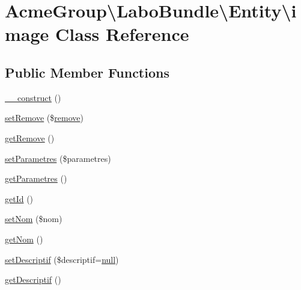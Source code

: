 \hypertarget{class_acme_group_1_1_labo_bundle_1_1_entity_1_1image}{\section{Acme\+Group\textbackslash{}Labo\+Bundle\textbackslash{}Entity\textbackslash{}image Class Reference}
\label{class_acme_group_1_1_labo_bundle_1_1_entity_1_1image}
}
\subsection*{Public Member Functions}
\begin{DoxyCompactItemize}
\item 
\hyperlink{class_acme_group_1_1_labo_bundle_1_1_entity_1_1image_aa2d1ca441aac516fc62f12dcbda72dad}{\+\_\+\+\_\+construct} ()
\item 
\hyperlink{class_acme_group_1_1_labo_bundle_1_1_entity_1_1image_a47f3c9cb7263e23f69d2a41422c66895}{set\+Remove} (\$\hyperlink{fullpage_2plugin_8min_8js_a3fe72a3812c61d06ea7c5cf2052f3dd2}{remove})
\item 
\hyperlink{class_acme_group_1_1_labo_bundle_1_1_entity_1_1image_a4228d93a78b52f097a9457e11b019880}{get\+Remove} ()
\item 
\hyperlink{class_acme_group_1_1_labo_bundle_1_1_entity_1_1image_af15509557d3d717c971e3a3719290ce8}{set\+Parametres} (\$parametres)
\item 
\hyperlink{class_acme_group_1_1_labo_bundle_1_1_entity_1_1image_a6f317bbb5610eede4e51395d07e6b376}{get\+Parametres} ()
\item 
\hyperlink{class_acme_group_1_1_labo_bundle_1_1_entity_1_1image_a27639d79aa66ce7b0d634f7e98c26cea}{get\+Id} ()
\item 
\hyperlink{class_acme_group_1_1_labo_bundle_1_1_entity_1_1image_ab0615daf61007af21762cabfb6e015b2}{set\+Nom} (\$nom)
\item 
\hyperlink{class_acme_group_1_1_labo_bundle_1_1_entity_1_1image_a8220e385ee52940bab2d7b1ded1a1a85}{get\+Nom} ()
\item 
\hyperlink{class_acme_group_1_1_labo_bundle_1_1_entity_1_1image_ad4eb5a597d2e8cad95264dae01c62528}{set\+Descriptif} (\$descriptif=\hyperlink{validate_8js_afb8e110345c45e74478894341ab6b28e}{null})
\item 
\hyperlink{class_acme_group_1_1_labo_bundle_1_1_entity_1_1image_a3f9a784d0bfb6f518d3b1d280a56b06a}{get\+Descriptif} ()

\end{DoxyCompactItemize}
